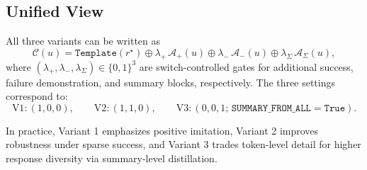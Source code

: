 \subsection{Unified View}
All three variants can be written as
\begin{equation}
\mathcal{C}(u)=\texttt{Template}(r^{\star})\oplus
\lambda_{+}\,\mathcal{A}_{+}(u)\oplus
\lambda_{-}\,\mathcal{A}_{-}(u)\oplus
\lambda_{\Sigma}\,\mathcal{A}_{\Sigma}(u),
\end{equation}
where $(\lambda_{+},\lambda_{-},\lambda_{\Sigma})\in\{0,1\}^3$ are switch-controlled gates for
additional success, failure demonstration, and summary blocks, respectively.
The three settings correspond to:
\begin{equation}
\text{V1}:(1,0,0),\qquad
\text{V2}:(1,1,0),\qquad
\text{V3}:(0,0,1;\,\texttt{SUMMARY\_FROM\_ALL}=\texttt{True}).
\end{equation}

In practice, Variant 1 emphasizes positive imitation, Variant 2 improves robustness under sparse success,
and Variant 3 trades token-level detail for higher response diversity via summary-level distillation.
